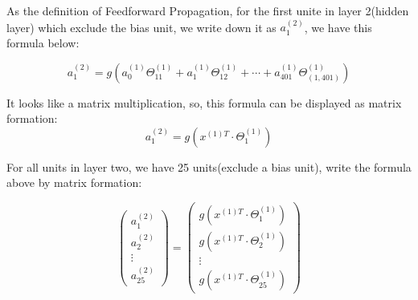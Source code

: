 \documentclass{article}
\begin{document}
As the definition of Feedforward Propagation, for the first unite in layer 2(hidden layer) which exclude the bias unit, we write down it as $a_{1}^{(2)}$, we have this formula below:

\begin{displaymath}
a_{1}^{(2)} = g(a_{0}^{(1)}\Theta_{11}^{(1)} + a_{1}^{(1)}\Theta_{12}^{(1)}
+ \cdots + a_{401}^{(1)}\Theta_{(1,401)}^{(1)})
\end{displaymath}

It looks like a matrix multiplication, so, this formula can be displayed as matrix formation:
\begin{displaymath}
a_{1}^{(2)} = g(x^{(1)T}\cdot \Theta^{(1)}_{1})
\end{displaymath}

For all units in layer two, we have 25 units(exclude a bias unit), write the formula above by matrix formation:

\begin{displaymath}
\begin{pmatrix}
a_{1}^{(2)}\\ a_{2}^{(2)} \\ \vdots \\ a_{25}^{(2)}
\end{pmatrix}
=
\begin{pmatrix}
g(x^{(1)T}\cdot \Theta^{(1)}_{1}) \\ g(x^{(1)T}\cdot \Theta^{(1)}_{2}) \\ \vdots \\ g(x^{(1)T}\cdot \Theta^{(1)}_{25})
\end{pmatrix}
\end{displaymath}
\end{document}
